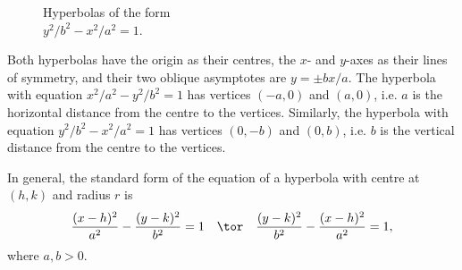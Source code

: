 \begin{minipage}{0.5\textwidth}
    \begin{figure}[H]
        \centering
        \captionsetup{singlelinecheck=false, aboveskip=7pt, belowskip=0pt,justification=centering}
        \setcapindent{0pt}
        \caption{Hyperbolas of the form\\$y^2/b^2 - x^2/a^2 = 1$.}
    \end{figure}
\end{minipage}

\medskip

Both hyperbolas have the origin as their centres, the $x$- and $y$-axes as their lines of symmetry, and their two oblique asymptotes are $y = \pm bx/a$. The hyperbola with equation $x^2/a^2 - y^2/b^2 = 1$ has vertices $(-a, 0)$ and $(a, 0)$, i.e. $a$ is the horizontal distance from the centre to the vertices. Similarly, the hyperbola with equation $y^2/b^2 - x^2/a^2 = 1$ has vertices $(0, -b)$ and $(0, b)$, i.e. $b$ is the vertical distance from the centre to the vertices.

In general, the standard form of the equation of a hyperbola with centre at $(h, k)$ and radius $r$ is \[\frac{(x-h)^2}{a^2} - \frac{(y-k)^2}{b^2} = 1 \quad \tor \quad \frac{(y-k)^2}{b^2} - \frac{(x-h)^2}{a^2} = 1,\] where $a, b > 0$.

